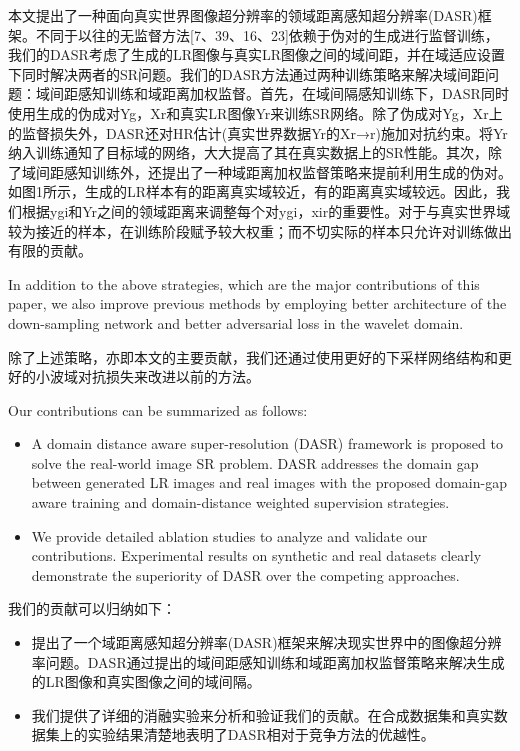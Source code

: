 本文提出了一种面向真实世界图像超分辨率的领域距离感知超分辨率(DASR)框架。不同于以往的无监督方法[7、39、16、23]依赖于伪对的生成进行监督训练，我们的DASR考虑了生成的LR图像与真实LR图像之间的域间距，并在域适应设置下同时解决两者的SR问题。我们的DASR方法通过两种训练策略来解决域间距问题：域间距感知训练和域距离加权监督。首先，在域间隔感知训练下，DASR同时使用生成的伪成对{Yg，Xr}和真实LR图像Yr来训练SR网络。除了伪成对{Yg，Xr}上的监督损失外，DASR还对HR估计(真实世界数据Yr的Xr→r)施加对抗约束。将Yr纳入训练通知了目标域的网络，大大提高了其在真实数据上的SR性能。其次，除了域间距感知训练外，还提出了一种域距离加权监督策略来提前利用生成的伪对。如图1所示，生成的LR样本有的距离真实域较近，有的距离真实域较远。因此，我们根据ygi和Yr之间的领域距离来调整每个对{ygi，xir}的重要性。对于与真实世界域较为接近的样本，在训练阶段赋予较大权重；而不切实际的样本只允许对训练做出有限的贡献。

In addition to the above strategies, which are the major contributions of this paper, we also improve previous methods by employing better architecture of the down-sampling network and better adversarial loss in the wavelet domain.

除了上述策略，亦即本文的主要贡献，我们还通过使用更好的下采样网络结构和更好的小波域对抗损失来改进以前的方法。

Our contributions can be summarized as follows:
\begin{itemize}
    \item A domain distance aware super-resolution (DASR) framework is proposed to solve the real-world image SR problem. DASR addresses the domain gap between generated LR images and real images with the proposed domain-gap aware training and domain-distance weighted supervision strategies.
    \item We provide detailed ablation studies to analyze and validate our contributions. Experimental results on synthetic and real datasets clearly demonstrate the superiority of DASR over the competing approaches.
\end{itemize}

我们的贡献可以归纳如下：
\begin{itemize}
    \item 提出了一个域距离感知超分辨率(DASR)框架来解决现实世界中的图像超分辨率问题。DASR通过提出的域间距感知训练和域距离加权监督策略来解决生成的LR图像和真实图像之间的域间隔。
    \item 我们提供了详细的消融实验来分析和验证我们的贡献。在合成数据集和真实数据集上的实验结果清楚地表明了DASR相对于竞争方法的优越性。
\end{itemize}

